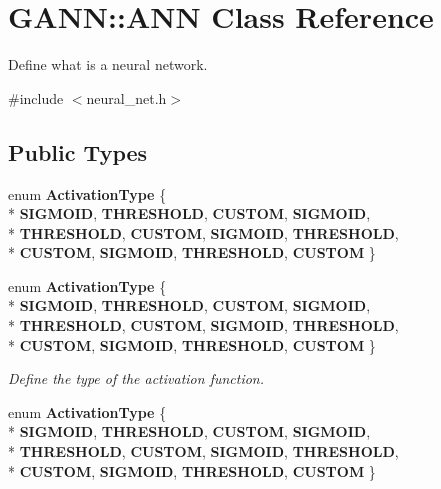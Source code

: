 \section{G\+A\+N\+N\+:\+:A\+N\+N Class Reference}
\label{class_g_a_n_n_1_1_a_n_n}


Define what is a neural network.  




{\ttfamily \#include $<$neural\+\_\+net.\+h$>$}

\subsection*{Public Types}
\begin{DoxyCompactItemize}
\item 
enum {\bfseries Activation\+Type} \{ \\*
{\bfseries S\+I\+G\+M\+O\+I\+D}, 
{\bfseries T\+H\+R\+E\+S\+H\+O\+L\+D}, 
{\bfseries C\+U\+S\+T\+O\+M}, 
{\bfseries S\+I\+G\+M\+O\+I\+D}, 
\\*
{\bfseries T\+H\+R\+E\+S\+H\+O\+L\+D}, 
{\bfseries C\+U\+S\+T\+O\+M}, 
{\bfseries S\+I\+G\+M\+O\+I\+D}, 
{\bfseries T\+H\+R\+E\+S\+H\+O\+L\+D}, 
\\*
{\bfseries C\+U\+S\+T\+O\+M}, 
{\bfseries S\+I\+G\+M\+O\+I\+D}, 
{\bfseries T\+H\+R\+E\+S\+H\+O\+L\+D}, 
{\bfseries C\+U\+S\+T\+O\+M}
 \}\label{class_g_a_n_n_1_1_a_n_n_a09793a3b1a3e795aed773d1a74a373f9}

\item 
enum {\bf Activation\+Type} \{ \\*
{\bfseries S\+I\+G\+M\+O\+I\+D}, 
{\bfseries T\+H\+R\+E\+S\+H\+O\+L\+D}, 
{\bfseries C\+U\+S\+T\+O\+M}, 
{\bfseries S\+I\+G\+M\+O\+I\+D}, 
\\*
{\bfseries T\+H\+R\+E\+S\+H\+O\+L\+D}, 
{\bfseries C\+U\+S\+T\+O\+M}, 
{\bfseries S\+I\+G\+M\+O\+I\+D}, 
{\bfseries T\+H\+R\+E\+S\+H\+O\+L\+D}, 
\\*
{\bfseries C\+U\+S\+T\+O\+M}, 
{\bfseries S\+I\+G\+M\+O\+I\+D}, 
{\bfseries T\+H\+R\+E\+S\+H\+O\+L\+D}, 
{\bfseries C\+U\+S\+T\+O\+M}
 \}\label{class_g_a_n_n_1_1_a_n_n_a09793a3b1a3e795aed773d1a74a373f9}
\begin{DoxyCompactList}\small\item\em Define the type of the activation function. \end{DoxyCompactList}
\item 
enum {\bfseries Activation\+Type} \{ \\*
{\bfseries S\+I\+G\+M\+O\+I\+D}, 
{\bfseries T\+H\+R\+E\+S\+H\+O\+L\+D}, 
{\bfseries C\+U\+S\+T\+O\+M}, 
{\bfseries S\+I\+G\+M\+O\+I\+D}, 
\\*
{\bfseries T\+H\+R\+E\+S\+H\+O\+L\+D}, 
{\bfseries C\+U\+S\+T\+O\+M}, 
{\bfseries S\+I\+G\+M\+O\+I\+D}, 
{\bfseries T\+H\+R\+E\+S\+H\+O\+L\+D}, 
\\*
{\bfseries C\+U\+S\+T\+O\+M}, 
{\bfseries S\+I\+G\+M\+O\+I\+D}, 
{\bfseries T\+H\+R\+E\+S\+H\+O\+L\+D}, 
{\bfseries C\+U\+S\+T\+O\+M}
 \}\label{class_g_a_n_n_1_1_a_n_n_a09793a3b1a3e795aed773d1a74a373f9}


\end{DoxyCompactItemize}
